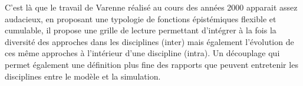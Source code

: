 




C'est là que le travail de Varenne réalisé au cours des années 2000 \autocites{Varenne2008, Varenne2013} apparait assez audacieux, en proposant une typologie de fonctions épistémiques flexible et cumulable, il propose une grille de lecture permettant d'intégrer à la fois la diversité des approches dans les disciplines (inter) mais également l'évolution de ces même approches à l'intérieur d'une discipline (intra). Un découplage qui permet également une définition plus fine des rapports que peuvent entretenir les disciplines entre le modèle et la simulation.

